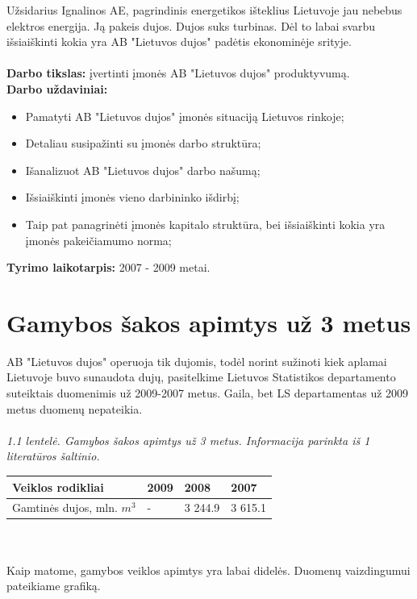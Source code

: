 \documentclass[11pt,a4paper]{article}
\begin{document}
Užsidarius Ignalinos AE, pagrindinis energetikos išteklius Lietuvoje jau nebebus 
elektros energija. Ją pakeis dujos. Dujos suks turbinas. Dėl to labai svarbu 
išsiaiškinti kokia yra AB "Lietuvos dujos" padėtis ekonominėje srityje.\\\\
\textbf{Darbo tikslas:} įvertinti įmonės AB "Lietuvos dujos" produktyvumą.\\
\textbf{Darbo uždaviniai:} 
\begin{itemize}
	\item Pamatyti AB "Lietuvos dujos" įmonės situaciją Lietuvos rinkoje;
	\item Detaliau susipažinti su įmonės darbo struktūra;
	\item Išanalizuot AB "Lietuvos dujos" darbo našumą;
	\item Išsiaiškinti įmonės vieno darbininko išdirbį;
	\item Taip pat panagrinėti įmonės kapitalo struktūra, bei išsiaiškinti kokia yra
	įmonės pakeičiamumo norma;
\end{itemize}
\textbf{Tyrimo laikotarpis:} 2007 - 2009 metai.\\

\newpage

\section{Gamybos šakos apimtys už 3 metus}

AB "Lietuvos dujos" operuoja tik dujomis, todėl norint sužinoti kiek aplamai 
Lietuvoje buvo sunaudota dujų, pasitelkime Lietuvos Statistikos departamento 
suteiktais duomenimis už 2009-2007 metus. Gaila, bet LS departamentas už 2009 
metus duomenų nepateikia.\\\\
\textsl{1.1 lentelė. Gamybos šakos apimtys už 3 metus. Informacija parinkta iš 1 
literatūros šaltinio.}\\
\begin{tabular}{|p{5cm}|p{3cm}|p{3cm}|p{3cm}|} \hline
	{Veiklos rodikliai} & {2009} & {2008} & {2007} \\ \hline
	Gamtinės dujos, mln. $m^3$ & - & 3 244.9 & 3 615.1 \\ \hline
\end{tabular}\\\\
Kaip matome, gamybos veiklos apimtys yra labai didelės. Duomenų vaizdingumui 
pateikiame grafiką.
\end{document}
